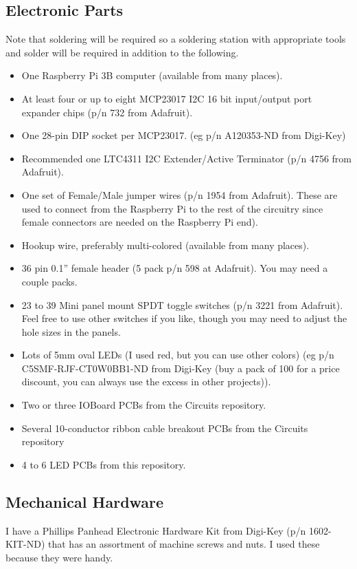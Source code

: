 \documentclass[10pt, openany]{book}
\begin{document}
\subsection{Electronic Parts}
Note that soldering will be required so a soldering station with appropriate tools and solder will be required in addition to the following.
\begin{itemize}
  \item One Raspberry Pi 3B computer (available from many places).
  \item At least four or up to eight MCP23017 I2C 16 bit input/output port expander chips (p/n 732 from Adafruit).
  \item One 28-pin DIP socket per MCP23017.  (eg p/n A120353-ND from Digi-Key)
  \item Recommended one LTC4311 I2C Extender/Active Terminator (p/n 4756 from Adafruit).
  \item One set of Female/Male jumper wires (p/n 1954 from Adafruit).  These are used to connect from the Raspberry Pi to the rest of the circuitry since female connectors are needed on the Raspberry Pi end).
  \item Hookup wire, preferably multi-colored (available from many places).
  \item 36 pin 0.1'' female header (5 pack p/n 598 at Adafruit).  You may need a couple packs.
  \item 23 to 39 Mini panel mount SPDT toggle switches (p/n 3221 from Adafruit).  Feel free to use other switches if you like, though you may need to adjust the hole sizes in the panels.
  \item Lots of 5mm oval LEDs (I used red, but you can use other colors) (eg p/n C5SMF-RJF-CT0W0BB1-ND from Digi-Key (buy a pack of 100 for a price discount, you can always use the excess in other projects)).
  \item Two or three IOBoard PCBs from the Circuits repository.
  \item Several 10-conductor ribbon cable breakout PCBs from the Circuits repository
  \item 4 to 6 LED PCBs from this repository.
\end{itemize}

\subsection{Mechanical Hardware}
I have a Phillips Panhead Electronic Hardware Kit from Digi-Key (p/n 1602-KIT-ND) that has an assortment of machine screws and nuts.  I used these because they were handy.
\end{document}
